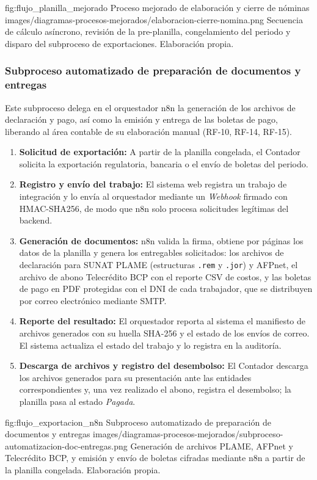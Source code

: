 \figuraEnTexto
    {fig:flujo_planilla_mejorado}
    {Proceso mejorado de elaboración y cierre de nóminas}
    {images/diagramas-procesos-mejorados/elaboracion-cierre-nomina.png}
    {Secuencia de cálculo asíncrono, revisión de la pre-planilla, congelamiento del periodo y disparo del subproceso de exportaciones. Elaboración propia.}

\subsubsection{Subproceso automatizado de preparación de documentos y entregas}

Este subproceso delega en el orquestador n8n la generación de los archivos de declaración y pago, así como la emisión y entrega de las boletas de pago, liberando al área contable de su elaboración manual (RF-10, RF-14, RF-15).

\begin{enumerate}
    \item \textbf{Solicitud de exportación:} A partir de la planilla congelada, el Contador solicita la exportación regulatoria, bancaria o el envío de boletas del periodo.
    \item \textbf{Registro y envío del trabajo:} El sistema web registra un trabajo de integración y lo envía al orquestador mediante un \textit{Webhook} firmado con HMAC-SHA256, de modo que n8n solo procesa solicitudes legítimas del backend.
    \item \textbf{Generación de documentos:} n8n valida la firma, obtiene por páginas los datos de la planilla y genera los entregables solicitados: los archivos de declaración para SUNAT PLAME (estructuras \texttt{.rem} y \texttt{.jor}) y AFPnet, el archivo de abono Telecrédito BCP con el reporte CSV de costos, y las boletas de pago en PDF protegidas con el DNI de cada trabajador, que se distribuyen por correo electrónico mediante SMTP.
    \item \textbf{Reporte del resultado:} El orquestador reporta al sistema el manifiesto de archivos generados con su huella SHA-256 y el estado de los envíos de correo. El sistema actualiza el estado del trabajo y lo registra en la auditoría.
    \item \textbf{Descarga de archivos y registro del desembolso:} El Contador descarga los archivos generados para su presentación ante las entidades correspondientes y, una vez realizado el abono, registra el desembolso; la planilla pasa al estado \textit{Pagada}.
\end{enumerate}

\figuraEnTexto
    {fig:flujo_exportacion_n8n}
    {Subproceso automatizado de preparación de documentos y entregas}
    {images/diagramas-procesos-mejorados/subproceso-automatizacion-doc-entregas.png}
    {Generación de archivos PLAME, AFPnet y Telecrédito BCP, y emisión y envío de boletas cifradas mediante n8n a partir de la planilla congelada. Elaboración propia.}
